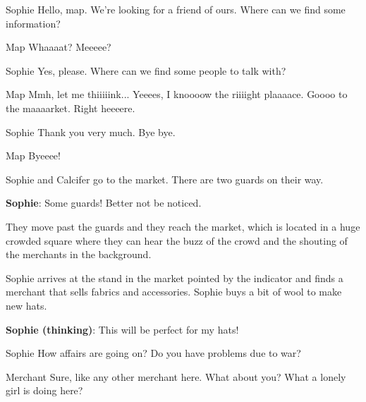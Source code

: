 \begin{screenplay}
\begin{dialogue}{Sophie}
Hello, map. We're looking for a friend of ours. Where can we find some information?
\end{dialogue}

\begin{dialogue}[tired]{Map}
Whaaaat? Meeeee?
\end{dialogue}

\begin{dialogue}{Sophie}
Yes, please. Where can we find some people to talk with?
\end{dialogue}

\begin{dialogue}[tired]{Map}
Mmh, let me thiiiiink... Yeeees, I knoooow the riiiight plaaaace. Goooo to the maaaarket. Right heeeere.
\end{dialogue}

\begin{dialogue}{Sophie}
Thank you very much. Bye bye.
\end{dialogue}

\begin{dialogue}[tired]{Map}
Byeeee!
\end{dialogue}

\end{screenplay}
\vspace{1em}

Sophie and Calcifer go to the market. There are two guards on their way.

\textbf{Sophie}: Some guards! Better not be noticed.

They move past the guards and they reach the market, which is located in a huge crowded square where they can hear the buzz of the crowd and the shouting of the merchants in the background.


Sophie arrives at the stand in the market pointed by the indicator and finds a merchant that sells fabrics and accessories.
Sophie buys a bit of wool to make new hats.

\textbf{Sophie (thinking)}: This will be perfect for my hats!

\begin{screenplay}

\begin{dialogue}{Sophie}
How affairs are going on? Do you have problems due to war?
\end{dialogue}

\begin{dialogue}[resigned]{Merchant}
Sure, like any other merchant here. What about you? What a lonely girl is doing here?
\end{dialogue}

\end{screenplay}

